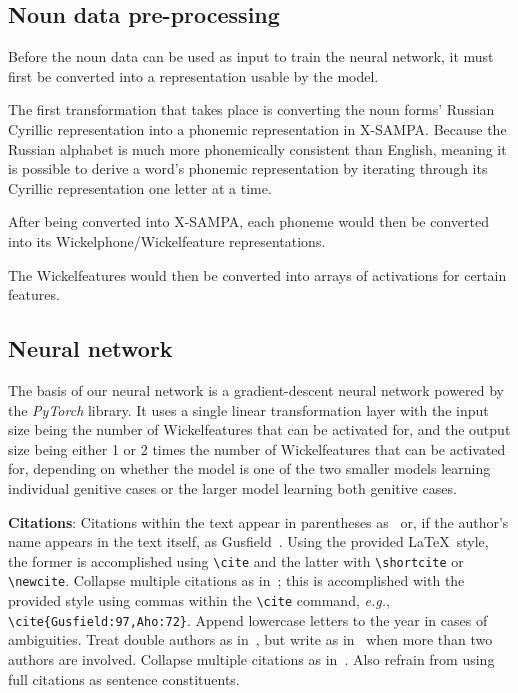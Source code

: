 \documentclass[11pt,a4paper]{article}
\begin{document}
\subsection{Noun data pre-processing}

Before the noun data can be used as input to train the neural network, it must
first be converted into a representation usable by the model.

The first transformation that takes place is converting the noun forms'
Russian Cyrillic representation into a phonemic representation in X-SAMPA\@.
Because the Russian alphabet is much more phonemically consistent than English,
meaning it is possible to derive a word's phonemic representation by iterating
through its Cyrillic representation one letter at a time.

After being converted into X-SAMPA, each phoneme would then be converted into
its Wickelphone/Wickelfeature representations.

The Wickelfeatures would then be converted into arrays of activations for
certain features. 

\subsection{Neural network}

The basis of our neural network is a gradient-descent neural network powered by the
\emph{PyTorch} library. It uses a single linear transformation layer with the
input size being the number of Wickelfeatures that can be activated for,
and the output size being either 1 or 2 times the number of Wickelfeatures
that can be activated for, depending on whether the model is one of the
two smaller models learning individual genitive cases or the larger model
learning both genitive cases.

\textbf{Citations}: Citations within the text appear in parentheses
as~\cite{Gusfield:97} or, if the author's name appears in the text
itself, as Gusfield~.
Using the provided \LaTeX\ style, the former is accomplished using
{\small\verb|\cite|} and the latter with {\small\verb|\shortcite|} or {\small\verb|\newcite|}. Collapse multiple citations as in~\cite{Gusfield:97,Aho:72}; this is accomplished with the provided style using commas within the {\small\verb|\cite|} command, \emph{e.g.}, {\small\verb|\cite{Gusfield:97,Aho:72}|}. Append lowercase letters to the year in cases of ambiguities.  
 Treat double authors as
in~\cite{Aho:72}, but write as in~\cite{Chandra:81} when more than two
authors are involved. Collapse multiple citations as
in~\cite{Gusfield:97,Aho:72}. Also refrain from using full citations
as sentence constituents.
\end{document}
